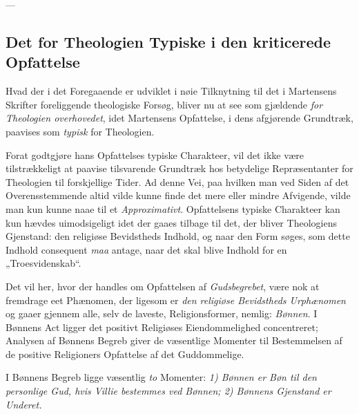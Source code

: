 \documentclass[12pt,a4paper]{book}
\newcommand{\opage}[1]{\marginnote{\footnotesize\textit{[#1]}}}
\begin{document}
\begin{center}---\end{center}

\subsection{Det for Theologien Typiske i den kriticerede Opfattelse}
\label{ssec:typiske}

Hvad der i det Foregaaende er udviklet i nøie Tilknytning til det i Martensens Skrifter
foreliggende theologiske \opage{95}Forsøg, bliver nu at see som gjældende \emph{for Theologien overhovedet}, idet Martensens Opfattelse, i dens afgjørende Grundtræk, paavises som \emph{typisk} for Theologien.

Forat godtgjøre hans Opfattelses typiske Charakteer, vil det ikke være tilstrækkeligt at
paavise tilsvarende Grundtræk hos betydelige Repræsentanter for Theologien til
forskjellige Tider. Ad denne Vei, paa hvilken man ved Siden af det Overensstemmende altid
vilde kunne finde det mere eller mindre Afvigende, vilde man kun kunne naae til et \emph{Approximativt}. Opfattelsens typiske Charakteer kan kun hævdes uimodsigeligt idet der gaaes
tilbage til det, der bliver Theologiens Gjenstand: den religiøse Bevidstheds Indhold, og
naar den Form søges, som dette Indhold consequent \emph{maa} antage, naar det skal blive Indhold
for en „Troesvidenskab“.

Det vil her, hvor der handles om Opfattelsen af \emph{Gudsbegrebet}, være nok at fremdrage
eet Phænomen, der ligesom er \emph{den religiøse Bevidstheds Urphænomen} og gaaer gjennem alle, selv de laveste, Religionsformer, nemlig: \emph{Bønnen}. I Bønnens Act ligger det
positivt Religiøses Eiendommelighed concentreret; Analysen af Bønnens Begreb giver de
væsentlige Momenter til Bestemmelsen af de positive Religioners Opfattelse af det
Guddommelige.

I Bønnens Begreb ligge væsentlig \emph{to} Momenter: \emph{1) Bønnen er Bøn til den personlige
Gud, hvis Villie bestemmes ved Bønnen; 2) Bønnens Gjenstand er Underet.}
\end{document}
